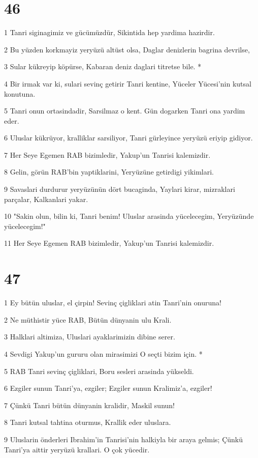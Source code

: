 \chapter{46}

\par 1 Tanri siginagimiz ve gücümüzdür, Sikintida hep yardima hazirdir.
\par 2 Bu yüzden korkmayiz yeryüzü altüst olsa, Daglar denizlerin bagrina devrilse,
\par 3 Sular kükreyip köpürse, Kabaran deniz daglari titretse bile. *
\par 4 Bir irmak var ki, sulari sevinç getirir Tanri kentine, Yüceler Yücesi'nin kutsal konutuna.
\par 5 Tanri onun ortasindadir, Sarsilmaz o kent. Gün dogarken Tanri ona yardim eder.
\par 6 Uluslar kükrüyor, kralliklar sarsiliyor, Tanri gürleyince yeryüzü eriyip gidiyor.
\par 7 Her Seye Egemen RAB bizimledir, Yakup'un Tanrisi kalemizdir.
\par 8 Gelin, görün RAB'bin yaptiklarini, Yeryüzüne getirdigi yikimlari.
\par 9 Savaslari durdurur yeryüzünün dört bucaginda, Yaylari kirar, mizraklari parçalar, Kalkanlari yakar.
\par 10 "Sakin olun, bilin ki, Tanri benim! Uluslar arasinda yücelecegim, Yeryüzünde yücelecegim!"
\par 11 Her Seye Egemen RAB bizimledir, Yakup'un Tanrisi kalemizdir.

\chapter{47}

\par 1 Ey bütün uluslar, el çirpin! Sevinç çigliklari atin Tanri'nin onuruna!
\par 2 Ne müthistir yüce RAB, Bütün dünyanin ulu Krali.
\par 3 Halklari altimiza, Uluslari ayaklarimizin dibine serer.
\par 4 Sevdigi Yakup'un gururu olan mirasimizi O seçti bizim için. *
\par 5 RAB Tanri sevinç çigliklari, Boru sesleri arasinda yükseldi.
\par 6 Ezgiler sunun Tanri'ya, ezgiler; Ezgiler sunun Kralimiz'a, ezgiler!
\par 7 Çünkü Tanri bütün dünyanin kralidir, Maskil sunun!
\par 8 Tanri kutsal tahtina oturmus, Krallik eder uluslara.
\par 9 Uluslarin önderleri Ibrahim'in Tanrisi'nin halkiyla bir araya gelmis; Çünkü Tanri'ya aittir yeryüzü krallari. O çok yücedir.

